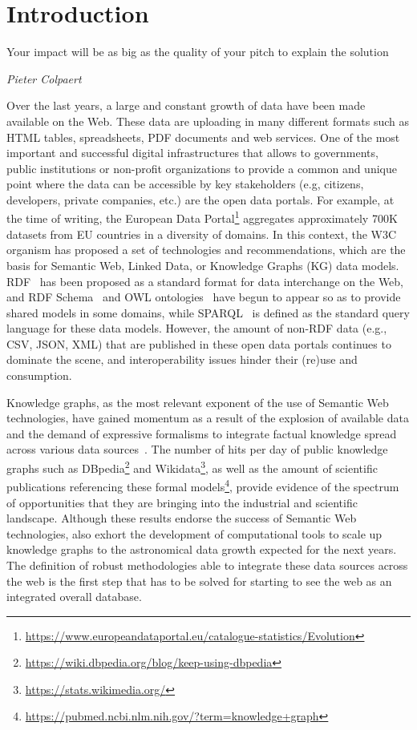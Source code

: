 \chapter{Introduction}
\label{chap:intro}

\epigraph{Your impact will be as big as the quality of your pitch to explain the solution}{\textit{Pieter Colpaert}}

Over the last years, a large and constant growth of data have been made available on the Web. These data are uploading in many different formats such as HTML tables, spreadsheets, PDF documents and web services. One of the most important and successful digital infrastructures that allows to governments, public institutions or non-profit organizations to provide a common and unique point where the data can be accessible by key stakeholders (e.g, citizens, developers, private companies, etc.) are the open data portals. For example, at the time of writing, the European Data Portal\footnote{\url{https://www.europeandataportal.eu/catalogue-statistics/Evolution}} aggregates approximately 700K datasets from EU countries in a diversity of domains. In this context, the W3C organism has proposed a set of technologies and recommendations, which are the basis for Semantic Web, Linked Data, or Knowledge Graphs (KG) data models. RDF~\citep{brickley1999resource} has been proposed as a standard format for data interchange on the Web, and RDF Schema~\citep{brickley2014rdf} and OWL ontologies~\citep{mcguinness2004owl} have begun to appear so as to provide shared models in some domains, while SPARQL~\citep{perez2009semantics} is defined as the standard query language for these data models. However, the amount of non-RDF data (e.g., CSV, JSON, XML) that are published in these open data portals continues to dominate the scene, and interoperability issues hinder their (re)use and consumption. 

Knowledge graphs, as the most relevant exponent of the use of Semantic Web technologies, have gained momentum as a result of the explosion of available data and the demand of expressive formalisms to integrate factual knowledge spread across various data sources~\citep{abs-2003-02320}. The number of hits per day of public knowledge graphs such as DBpedia\footnote{\url{https://wiki.dbpedia.org/blog/keep-using-dbpedia}} and Wikidata\footnote{\url{https://stats.wikimedia.org/}}, as well as the amount of scientific publications referencing these formal models\footnote{\url{https://pubmed.ncbi.nlm.nih.gov/?term=knowledge+graph}}, provide evidence of the spectrum of opportunities that they are bringing into the industrial and scientific landscape. Although these results endorse the success of Semantic Web technologies, also exhort the development of computational tools to scale up knowledge graphs to the astronomical data growth expected for the next years. The definition of robust methodologies able to integrate these data sources across the web is the first step that has to be solved for starting to see the web as an integrated overall database.



